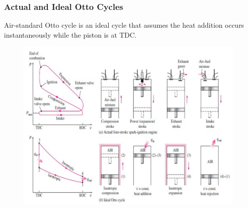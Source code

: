 \documentclass[10pt,compress]{beamer}
\begin{document}
\begin{frame}
 \frametitle{Actual and Ideal Otto Cycles}
    Air-standard Otto cycle is an ideal cycle that assumes the heat addition occurs instantaneously while the piston is at TDC.
    \begin{figure}%
     \begin{center}
      \includegraphics[width=9.cm,clip]{./Pics/InternalCombustion_IdealOttoCycle}
     \end{center}
    \end{figure} 
\end{frame}
\end{document}
